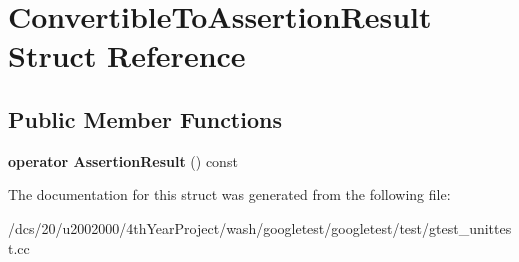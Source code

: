 \hypertarget{structConvertibleToAssertionResult}{}\section{Convertible\+To\+Assertion\+Result Struct Reference}
\label{structConvertibleToAssertionResult}
\subsection*{Public Member Functions}
\begin{DoxyCompactItemize}
\item 
\mbox{\label{structConvertibleToAssertionResult_a0f816f2f25ecaf29a95b3cfd4033e105}} 
{\bfseries operator Assertion\+Result} () const
\end{DoxyCompactItemize}


The documentation for this struct was generated from the following file\+:\begin{DoxyCompactItemize}
\item 
/dcs/20/u2002000/4th\+Year\+Project/wash/googletest/googletest/test/gtest\+\_\+unittest.\+cc\end{DoxyCompactItemize}

